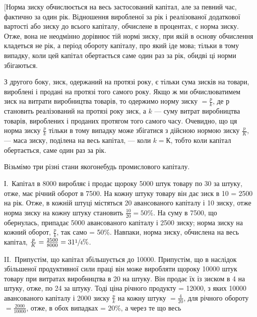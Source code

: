 
[Норма зиску обчислюється на весь застосований капітал, але за певний час, фактично за один рік.
Відношення виробленої за рік і реалізованої додаткової вартості або зиску до всього капіталу,
обчислене в процентах, є норма зиску. Отже, вона не неодмінно дорівнює тій нормі зиску, при якій в
основу обчислення кладеться не рік, а період обороту капіталу, про який іде мова; тільки в тому
випадку, коли цей капітал обертається саме один раз за рік, обидві ці норми збігаються.

З другого боку, зиск, одержаний на протязі року, є тільки сума зисків на товари, вироблені і продані
на протязі того самого року. Якщо ж ми обчислюватимем зиск на витрати виробництва товарів, то
одержимо норму зиску $= \frac{p}{k}$, де $р$ становить реалізований на протязі року зиск, а $k$ — суму витрат
виробництва товарів, вироблених і проданих протягом того самого часу. Очевидно, що ця норма зиску
$\frac{p}{k}$ тільки в тому випадку може збігатися з дійсною нормою зиску $\frac{p}{K}$, — маса зиску, поділена на весь
капітал, — коли $k = К$, тобто коли капітал обертається, саме один раз за рік.

Візьмімо три різні стани якогонебудь промислового капіталу.

І.~Капітал в 8000 виробляє і продає щороку 5000 штук товару по 30 за
штуку, отже, має річний оборот в 7500. На кожну штуку товару
він дає зиск в 10 = 2500 на рік. Отже, в кожній штуці містяться 20 авансованого капіталу і 10 зиску, отже норма зиску на кожну штуку становить
$\frac{10}{20}= 50\%$. На суму в 7500, що обернулась, припадає 5000
авансованого капіталу і 2500 зиску; норма зиску на кожний оборот, $\frac{p}{k}$, так само =
50\%. Навпаки, норма зиску, обчислена на весь капітал, $\frac{p}{K} = \frac{2500}{8000} = 31\sfrac{1}{4}\%$.

II.~Припустім, що капітал збільшується до \num{10000}. Припустім, що в наслідок
збільшеної продуктивної сили праці він може виробляти щороку \num{10000} штук товару при витратах
виробництва в 20 на штуку. Він продає їх із зиском в 4 на штуку, отже, по 24 за штуку. Тоді ціна річного продукту = \num{12000}, з яких \num{10000} авансованого капіталу і 2000 зиску $\frac{p}{k}$ на кожну штуку $= \frac{4}{20}$, для річного
обороту $= \frac{2000}{\num{10000}}$, отже, в обох випадках = 20\%, а через те що весь
\parbreak{}  %
